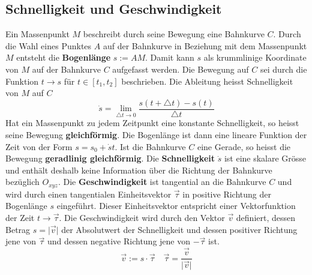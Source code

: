 \subsection{Schnelligkeit und Geschwindigkeit}
Ein Massenpunkt $M$ beschreibt durch seine Bewegung eine Bahnkurve $C$. Durch die Wahl eines Punktes $A$ auf der Bahnkurve in Beziehung mit dem Massenpunkt $M$ entsteht die \textbf{Bogenlänge} $s:={AM}$. Damit kann $s$ als krummlinige Koordinate von $M$ auf der Bahnkurve $C$ aufgefasst werden. Die Bewegung auf $C$ sei durch die Funktion $t\rightarrow s$ für $t\in[t_1, t_2]$ beschrieben. Die Ableitung heisst Schnelligkeit von $M$ auf $C$
\begin{equation}
\boxed{\dot{s}=\displaystyle \lim_{\triangle t\rightarrow 0}\dfrac{s\left(t+\triangle t\right)-s\left(t\right)}{\triangle t}}
\end{equation}
Hat ein Massenpunkt zu jedem Zeitpunkt eine konstante Schnelligkeit, so heisst seine Bewegung \textbf{gleichförmig}. Die Bogenlänge ist dann eine lineare Funktion der Zeit von der Form $s=s_0+\dot{s}t$. Ist die Bahnkurve $C$ eine Gerade, so heisst die Bewegung \textbf{geradlinig gleichförmig}.
\newline\newline
Die \textbf{Schnelligkeit} $\dot{s}$ ist eine skalare Grösse und enthält deshalb keine Information über die Richtung der Bahnkurve bezüglich $O_{xyz}$. Die \textbf{Geschwindigkeit} ist tangential an die Bahnkurve $C$ und wird durch einen tangentialen Einheitsvektor $\overrightarrow{\tau}$ in positive Richtung der Bogenlänge $s$ eingeführt. Dieser Einheitsvektor entspricht einer Vektorfunktion der Zeit $t\rightarrow \overrightarrow{\tau}$. Die Geschwindigkeit wird durch den Vektor $\overrightarrow{v}$ definiert, dessen Betrag $s=\Big\vert\overrightarrow{v}\Big\vert$ der Absolutwert der Schnelligkeit und dessen positiver Richtung jene von $\overrightarrow{\tau}$ und dessen negative Richtung jene von $-\overrightarrow{\tau}$ ist. 
\begin{equation} 
\boxed{\overrightarrow{v}:=s\cdot \overrightarrow{\tau}}\quad \boxed{\overrightarrow{\tau}=\dfrac{\overrightarrow{v}}{\Big\vert\overrightarrow{v}\Big\vert}}
\end{equation}
